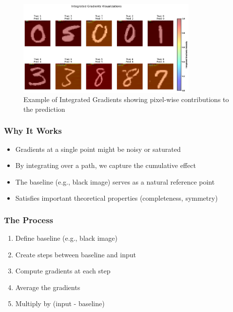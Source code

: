 \documentclass{article}
\begin{document}
\begin{figure}[h]
    \centering
    \includegraphics[width=0.8\textwidth]{images/integrated_gradients.png}
    \caption{Example of Integrated Gradients showing pixel-wise contributions to the prediction}
    \label{fig:integrated_gradients}
\end{figure}

\subsubsection{Why It Works}
\begin{itemize}
    \item Gradients at a single point might be noisy or saturated
    \item By integrating over a path, we capture the cumulative effect
    \item The baseline (e.g., black image) serves as a natural reference point
    \item Satisfies important theoretical properties (completeness, symmetry)
\end{itemize}

\subsubsection{The Process}
\begin{enumerate}
    \item Define baseline (e.g., black image)
    \item Create steps between baseline and input
    \item Compute gradients at each step
    \item Average the gradients
    \item Multiply by (input - baseline)
\end{enumerate}
\end{document}
